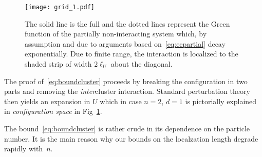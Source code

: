 \documentclass[reqno,keywordsasfootnote]{article}
\numberwithin{equation}{section}
\theoremstyle{definition}
\begin{document}
\begin{figure}[h]
\begin{center}
\begin{minipage}{.45\textwidth}
 \texttt{[image: grid\_1.pdf]}
\end{minipage}\hfill\begin{minipage}{.5\textwidth}
\caption{\small The solid line is the full  and
the dotted lines represent the Green function of the partially non-interacting system which, by assumption and due to arguments based on~\eqref{eq:ecpartial} decay exponentially. Due to finite range, the interaction is localized  to the shaded strip of width $2 \ell_U $ about the diagonal.}\label{fig2}
\end{minipage}
\end{center}
\end{figure}
The proof of~\eqref{eq:boundcluster} proceeds by breaking the configuration in two parts and removing the \emph{inter}cluster interaction. 
Standard perturbation theory then yields an expansion in $ U $ which in case  $ n = 2 $, $ d = 1 $ is pictorially explained in {\it configuration space} in Fig~\ref{fig2}.

The bound~\eqref{eq:boundcluster} is rather crude in its dependence on the particle number. It is the main reason why our bounds on the 
localzation length degrade rapidly with~$ n $.
\end{document}
